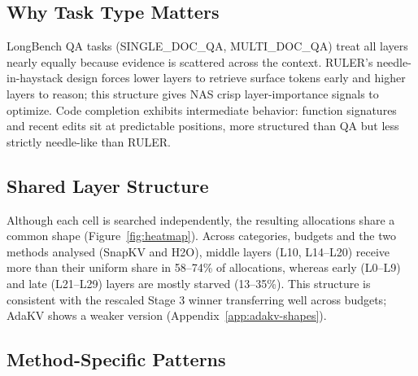 \documentclass[11pt]{article}
\begin{document}


\subsection{Why Task Type Matters}

LongBench QA tasks (SINGLE\_DOC\_QA, MULTI\_DOC\_QA) treat all layers nearly equally because evidence is scattered across the context. RULER's needle-in-haystack design forces lower layers to retrieve surface tokens early and higher layers to reason; this structure gives NAS crisp layer-importance signals to optimize. Code completion exhibits intermediate behavior: function signatures and recent edits sit at predictable positions, more structured than QA but less strictly needle-like than RULER.

\subsection{Shared Layer Structure}

Although each cell is searched independently, the resulting allocations share a common shape (Figure~\ref{fig:heatmap}). Across categories, budgets and the two methods analysed (SnapKV and H2O), middle layers (L10, L14--L20) receive more than their uniform share in 58--74\% of allocations, whereas early (L0--L9) and late (L21--L29) layers are mostly starved (13--35\%). This structure is consistent with the rescaled Stage 3 winner transferring well across budgets; AdaKV shows a weaker version (Appendix~\ref{app:adakv-shapes}).

\subsection{Method-Specific Patterns}
\end{document}
